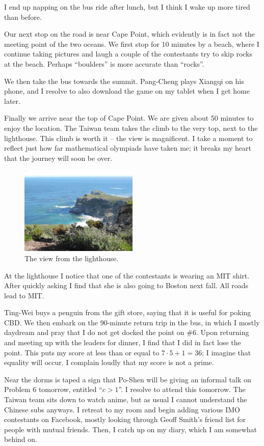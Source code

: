 \documentclass[11pt]{scrreprt}
\numberwithin{figure}{chapter}
\begin{document}
I end up napping on the bus ride after lunch, but I think I wake up more tired than before.

Our next stop on the road is near Cape Point, which evidently is in fact not the meeting point of the two oceans.
We first stop for 10 minutes by a beach, where I continue taking pictures and laugh a couple of the
contestants try to skip rocks at the beach. Perhaps ``boulders'' is more accurate than ``rocks''.

We then take the bus towards the summit. Pang-Cheng plays Xiangqi on his phone, and I resolve to also download
the game on my tablet when I get home later.

Finally we arrive near the top of Cape Point. We are given about 50 minutes to enjoy the location.
The Taiwan team takes the climb to the very top, next to the lighthouse.
This climb is worth it -- the view is magnificent.
I take a moment to reflect just how far mathematical olympiads have taken me; it breaks my heart that
the journey will soon be over.

\begin{figure}[ht]
  \centering
  \includegraphics[width=0.5\textwidth]{media/lighthouse_tip.jpg}
  \caption{The view from the lighthouse.}
\end{figure}

At the lighthouse I notice that one of the contestants is wearing an MIT shirt.
After quickly asking I find that she is also going to Boston next fall.
All roads lead to MIT.

Ting-Wei buys a penguin from the gift store, saying that it is useful for poking CBD.
We then embark on the 90-minute return trip in the bus, in which I mostly daydream and pray that
I do not get docked the point on \#6. Upon returning and meeting up with the leaders for dinner,
I find that I did in fact lose the point.  This puts my score at less than or equal to $7 \cdot 5 + 1 = 36$;
I imagine that equality will occur.  I complain loudly that my score is not a prime.

Near the dorms is taped a sign that Po-Shen will be giving an informal talk on Problem 6 tomorrow,
entitled ``$c > 1$''. I resolve to attend this tomorrow.
The Taiwan team sits down to watch anime, but as usual I cannot understand the Chinese subs anyways.
I retreat to my room and begin adding various IMO contestants on Facebook, mostly looking through Geoff Smith's
friend list for people with mutual friends.
Then, I catch up on my diary, which I am somewhat behind on.
\end{document}
